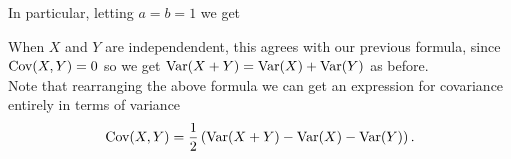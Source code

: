 \noindent In particular, letting $a = b = 1$ we get

  	\bigskip
	
	\hfil{}
	\bigskip
	

\noindent When $X$ and $Y$ are independendent, this agrees with our previous formula, since $\text{Cov}(X,Y) = 0$ so we get $\text{Var}(X + Y) = \text{Var}(X) + \text{Var}(Y)$ as before. \\

\noindent Note that rearranging the above formula we can get an expression for covariance entirely in terms of variance
\[
\text{Cov}(X,Y) = \frac{1}{2}\left(\text{Var}(X + Y) - \text{Var}(X) - \text{Var}(Y)\right).
\]